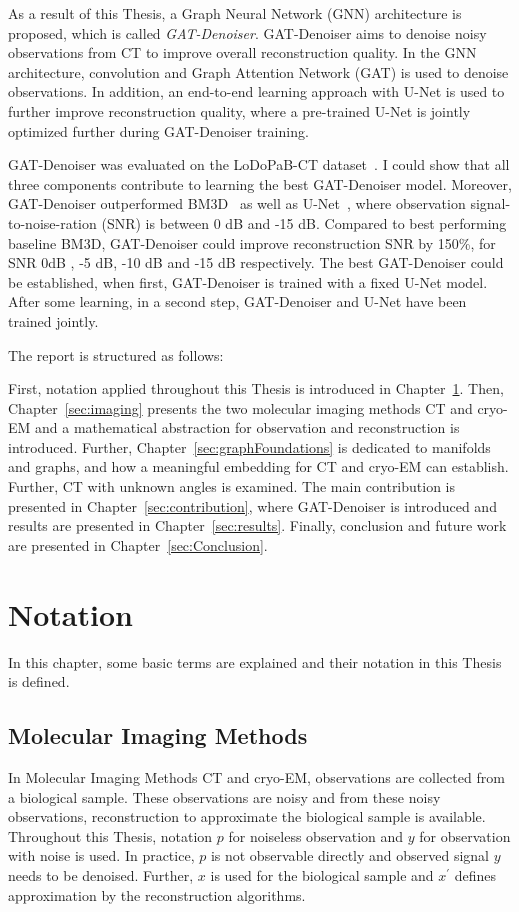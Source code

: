 \clearpage

As a result of this Thesis, a Graph Neural Network (GNN) architecture is proposed, which is called \textit{GAT-Denoiser}.
GAT-Denoiser aims to denoise noisy observations from CT to improve overall reconstruction quality.
In the GNN architecture, convolution and Graph Attention Network (GAT) is used to denoise observations.
In addition, an end-to-end learning approach with U-Net is used to further improve reconstruction quality, 
where a pre-trained U-Net is jointly optimized further during GAT-Denoiser training.

GAT-Denoiser was evaluated on the LoDoPaB-CT dataset~\cite{lodopab-dataset}.
I could show that all three components contribute to learning the best GAT-Denoiser model.
Moreover, GAT-Denoiser outperformed BM3D~\cite{bm3d} as well as U-Net~\cite{unet-tomography},
where observation signal-to-noise-ration (SNR) is between 0 dB and -15 dB.
Compared to best performing baseline BM3D, GAT-Denoiser could improve reconstruction SNR 
by 150\%, for SNR 0dB , -5 dB, -10 dB and -15 dB respectively.
The best GAT-Denoiser could be established, when first, GAT-Denoiser is trained with a fixed U-Net model.
After some learning, in a second step, GAT-Denoiser and U-Net have been trained jointly.


\bigskip

The report is structured as follows: 

First, notation applied throughout this Thesis is introduced in Chapter~\ref{sec:notation}.
Then, Chapter~\ref{sec:imaging} presents the two molecular imaging methods
CT and cryo-EM and a mathematical abstraction for observation and reconstruction is introduced.
Further, Chapter~\ref{sec:graphFoundations} is dedicated to manifolds and graphs,
and how a meaningful embedding for CT and cryo-EM can establish. 
Further, CT with unknown angles is examined.
The main contribution is presented in Chapter~\ref{sec:contribution}, 
where GAT-Denoiser is introduced and results are presented in Chapter~\ref{sec:results}.
Finally, conclusion and future work are presented in Chapter~\ref{sec:Conclusion}.

\chapter{Notation}
\label{sec:notation}

In this chapter, some basic terms are explained and their notation in this Thesis is defined.

\section{Molecular Imaging Methods}
In Molecular Imaging Methods CT and cryo-EM, observations are collected from a biological sample. 
These observations are noisy and from these noisy observations, reconstruction to approximate the biological sample is available.
Throughout this Thesis, notation $p$ for noiseless observation and $y$ for observation with noise is used.
In practice, $p$ is not observable directly and observed signal $y$ needs to be denoised.
Further, $x$ is used for the biological sample and $x^{\prime}$ defines approximation by the reconstruction algorithms.

